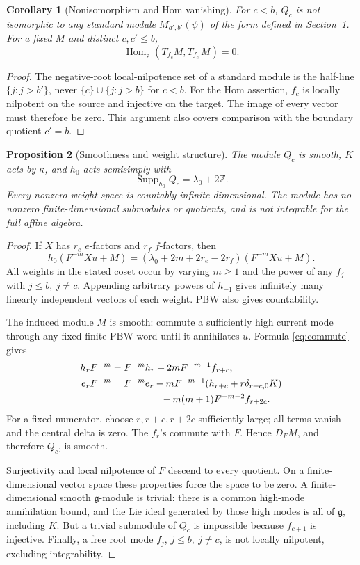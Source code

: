 \documentclass[11pt,a4paper]{article}
\newcommand{\Z}{\mathbb Z}
\newcommand{\g}{\mathfrak g}
\newcommand{\Hom}{\operatorname{Hom}}
\newcommand{\Supp}{\operatorname{Supp}}
\theoremstyle{plainupright}
\newtheorem{proposition}{Proposition}[section]
\newtheorem{corollary}[proposition]{Corollary}
\begin{document}
\begin{corollary}[Nonisomorphism and Hom vanishing]\label{cor:hom}
For \(c<b\), \(Q_c\) is not isomorphic to any standard module
\(M_{a',b'}(\psi)\) of the form defined in Section~1.
For a fixed \(M\) and distinct \(c,c'\le b\),
\[
\Hom_\g(T_{f_c}M,T_{f_{c'}}M)=0.
\]
\end{corollary}
\begin{proof}
The negative-root local-nilpotence set of a standard module is the half-line
\(\{j:j>b'\}\), never \(\{c\}\cup\{j:j>b\}\) for \(c<b\).
For the Hom assertion, \(f_c\) is locally nilpotent on the source and
injective on the target. The image of every vector must therefore be zero.
This argument also covers comparison with the boundary quotient \(c'=b\).
\end{proof}

\begin{proposition}[Smoothness and weight structure]\label{prop:smooth}
The module \(Q_c\) is smooth, \(K\) acts by \(\kappa\), and \(h_0\) acts
semisimply with
\[
\Supp_{h_0}Q_c=\lambda_0+2\Z.
\]
Every nonzero weight space is countably infinite-dimensional.
The module has no nonzero finite-dimensional submodules or quotients,
and is not integrable for the full affine algebra.
\end{proposition}
\begin{proof}
If \(X\) has \(r_e\) \(e\)-factors and \(r_f\) \(f\)-factors, then
\[
h_0(F^{-m}Xu+M)
=(\lambda_0+2m+2r_e-2r_f)(F^{-m}Xu+M).
\]
All weights in the stated coset occur by varying \(m\ge1\) and the power
of any \(f_j\) with \(j\le b,\ j\ne c\).
Appending arbitrary powers of \(h_{-1}\) gives infinitely many linearly
independent vectors of each weight. PBW also gives countability.

The induced module \(M\) is smooth: commute a sufficiently high current
mode through any fixed finite PBW word until it annihilates \(u\).
Formula \eqref{eq:commute} gives
\begin{align}
h_rF^{-m}
 &=F^{-m}h_r+2mF^{-m-1}f_{r+c},\label{eq:hcomm}\\
e_rF^{-m}
 &=F^{-m}e_r-mF^{-m-1}(h_{r+c}+r\delta_{r+c,0}K)\notag\\
 &\hspace{18mm}-m(m+1)F^{-m-2}f_{r+2c}.\label{eq:ecomm}
\end{align}
For a fixed numerator, choose \(r,r+c,r+2c\) sufficiently large; all
terms vanish and the central delta is zero. The \(f_r\)'s commute with
\(F\). Hence \(D_FM\), and therefore \(Q_c\), is smooth.

Surjectivity and local nilpotence of \(F\) descend to every quotient.
On a finite-dimensional vector space these properties force the space
to be zero. A finite-dimensional smooth \(\g\)-module is trivial:
there is a common high-mode annihilation bound, and the Lie ideal
generated by those high modes is all of \(\g\), including \(K\).
But a trivial submodule of \(Q_c\) is impossible because \(f_{c+1}\)
is injective. Finally, a free root mode \(f_j\), \(j\le b,\ j\ne c\),
is not locally nilpotent, excluding integrability.
\end{proof}
\end{document}
